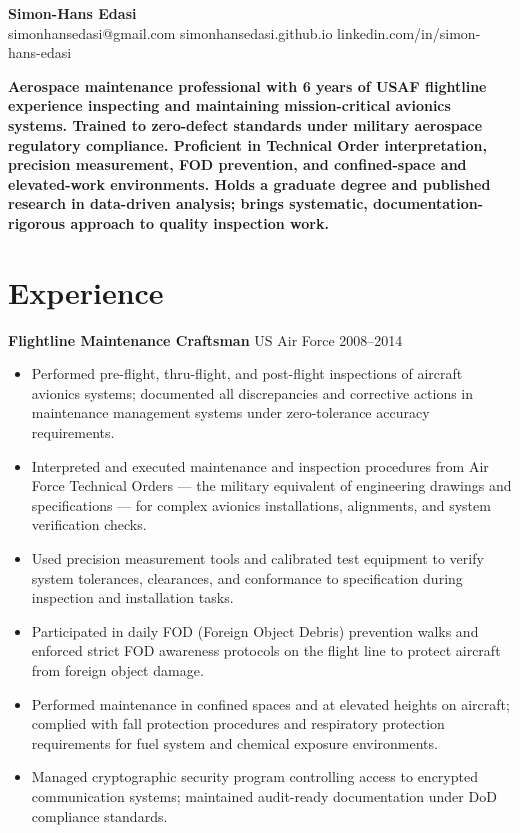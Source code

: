 \documentclass[11pt,a4paper]{article}
\begin{document}
\begin{center}
    {\LARGE \textbf{Simon-Hans Edasi}} \\[6pt]
    simonhansedasi@gmail.com \hfill \textbar \hfill
    simonhansedasi.github.io \hfill \textbar \hfill
    linkedin.com/in/simon-hans-edasi
\end{center}

\vspace{0.3cm}

\noindent
\textbf{Aerospace maintenance professional with 6 years of USAF flightline experience inspecting and maintaining mission-critical avionics systems. Trained to zero-defect standards under military aerospace regulatory compliance. Proficient in Technical Order interpretation, precision measurement, FOD prevention, and confined-space and elevated-work environments. Holds a graduate degree and published research in data-driven analysis; brings systematic, documentation-rigorous approach to quality inspection work.}

\section*{Experience}

\noindent
\textbf{Flightline Maintenance Craftsman} \hfill US Air Force \hfill 2008--2014
\begin{itemize}
    \item Performed pre-flight, thru-flight, and post-flight inspections of aircraft avionics systems; documented all discrepancies and corrective actions in maintenance management systems under zero-tolerance accuracy requirements.
    \item Interpreted and executed maintenance and inspection procedures from Air Force Technical Orders --- the military equivalent of engineering drawings and specifications --- for complex avionics installations, alignments, and system verification checks.
    \item Used precision measurement tools and calibrated test equipment to verify system tolerances, clearances, and conformance to specification during inspection and installation tasks.
    \item Participated in daily FOD (Foreign Object Debris) prevention walks and enforced strict FOD awareness protocols on the flight line to protect aircraft from foreign object damage.
    \item Performed maintenance in confined spaces and at elevated heights on aircraft; complied with fall protection procedures and respiratory protection requirements for fuel system and chemical exposure environments.
    \item Managed cryptographic security program controlling access to encrypted communication systems; maintained audit-ready documentation under DoD compliance standards.
\end{itemize}
\end{document}
